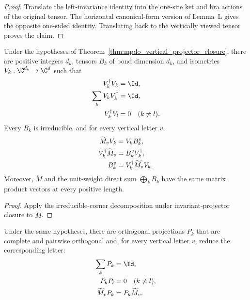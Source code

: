 \begin{proof}
    \leanok
    Translate the left-invariance identity into the one-site ket and bra
    actions of the original tensor. The horizontal canonical-form version of
    Lemma~L gives the opposite one-sided identity. Translating back to the
    vertically viewed tensor proves the claim.
\end{proof}

\begin{theorem}
    \label{thm:mpdo_vertical_irreducible_reducing_sectors}
    \leanok
    Under the hypotheses of
    Theorem~\ref{thm:mpdo_vertical_projector_closure}, there are positive
    integers $d_k$, tensors $B_k$ of bond dimension $d_k$, and isometries
    $V_k:\C^{d_k}\to\C^d$ such that
    \begin{align}
        V_k^\dagger V_k&=\Id,
        \notag\\
        \sum_kV_kV_k^\dagger&=\Id,
        \notag\\
        V_k^\dagger V_l&=0\quad(k\ne l).
        \notag
    \end{align}
    Every $B_k$ is irreducible, and for every vertical letter $v$,
    \begin{align}
        \widetilde M_vV_k&=V_kB_k^v,
        \notag\\
        V_k^\dagger\widetilde M_v&=B_k^vV_k^\dagger,
        \notag\\
        B_k^v&=V_k^\dagger\widetilde M_vV_k.
        \notag
    \end{align}
    Moreover, $\widetilde M$ and the unit-weight direct sum
    $\bigoplus_kB_k$ have the same matrix product vectors at every positive
    length.
\end{theorem}

\begin{proof}
    \leanok
    Apply the irreducible-corner decomposition under invariant-projector
    closure to $\widetilde M$.
\end{proof}

\begin{theorem}
    \label{thm:mpdo_vertical_complete_reducing_projectors}
    \leanok
    Under the same hypotheses, there are orthogonal projections $P_k$ that
    are complete and pairwise orthogonal and, for every vertical letter $v$,
    reduce the corresponding letter:
    \begin{align}
        \sum_kP_k&=\Id,
        \notag\\
        P_kP_l&=0\quad(k\ne l),
        \notag\\
        \widetilde M_vP_k&=P_k\widetilde M_v.
        \notag
    \end{align}
\end{theorem}

